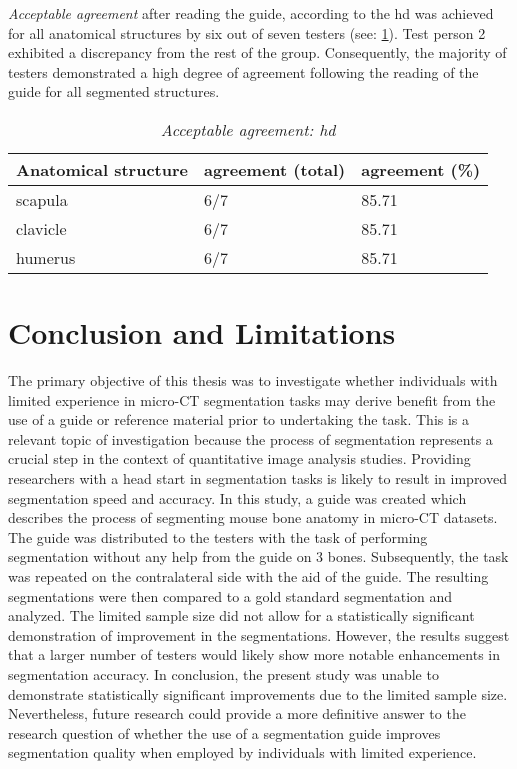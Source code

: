 \noindent
\textit{Acceptable agreement} after reading the guide, according to the \acrshort{hd} was achieved for all anatomical
structures by six out of seven testers (see: \cref{tab:hd-acceptable}).
Test person 2 exhibited a discrepancy from the rest of the group.
Consequently, the majority of testers demonstrated a high degree of agreement following the reading of the guide for all segmented structures.
\begin{table}[ht]
	\begin{center}
		\begin{tabular}{l l l}
			\textbf{Anatomical structure} & agreement (total) & agreement (\%) \\
			\hline
			scapula                       & 6/7               & 85.71          \\
			clavicle                      & 6/7               & 85.71          \\
			humerus                       & 6/7               & 85.71          \\
		\end{tabular}
		\caption{\textit{Acceptable agreement: \acrshort{hd}}}\label{tab:hd-acceptable}
	\end{center}
\end{table}


\chapter{Conclusion and Limitations}\label{c:conclusion}
The primary objective of this thesis was to investigate whether individuals with limited experience in micro-CT segmentation tasks may derive benefit from
the use of a guide or reference material prior to undertaking the task.
This is a relevant topic of investigation because the process of segmentation represents a crucial step in the context of quantitative image analysis studies.
Providing researchers with a head start in segmentation tasks is likely to result in improved segmentation speed and accuracy.
In this study, a guide was created which describes the process of segmenting mouse bone anatomy in micro-CT datasets.
The guide was distributed to the testers with the task of performing segmentation without any help from the guide on 3 bones.
Subsequently, the task was repeated on the contralateral side with the aid of the guide.
The resulting segmentations were then compared to a gold standard segmentation and analyzed.
The limited sample size did not allow for a statistically significant demonstration of improvement in the segmentations.
However, the results suggest that a larger number of testers would likely show more notable enhancements in segmentation accuracy.
In conclusion, the present study was unable to demonstrate statistically significant improvements due to the limited sample size.
Nevertheless, future research could provide a more definitive answer to the research question of whether the use of a
segmentation guide improves segmentation quality when employed by individuals with limited experience.


